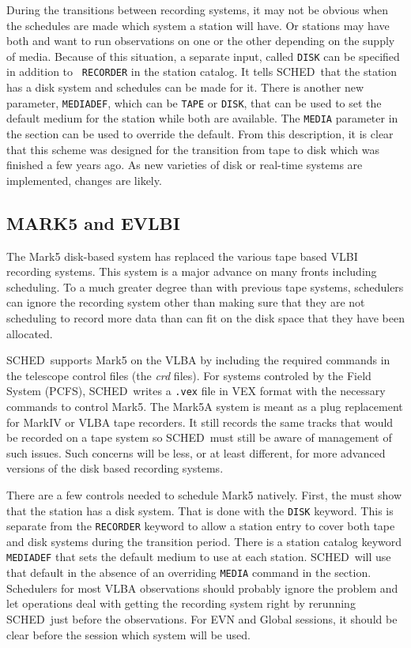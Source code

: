 \documentclass{report}
\newcommand{\schedb}{{\sc SCHED~}}
\begin{document}
During the transitions between recording systems, it may not be
obvious when the schedules are made which system a station will have.
Or stations may have both and want to run observations on one or the
other depending on the supply of media.  Because of this situation, a
separate input, called {\tt DISK} can be specified in addition to {\tt
RECORDER} in the station catalog.  It tells \schedb that the station
has a disk system and schedules can be made for it.  There is another
new parameter, {\tt MEDIADEF}, which can be {\tt TAPE} or {\tt DISK},
that can be used to set the default medium for the station while both
are available.  The {\tt MEDIA} parameter in the  section can be used to override the default.
From this description, it is clear that this scheme was designed for
the transition from tape to disk which was finished a few years ago.
As new varieties of disk or real-time systems are implemented, changes
are likely.

\subsection{\label{SSEC:MK5}MARK5 and EVLBI}

The Mark5 disk-based system has replaced the various tape based VLBI
recording systems.  This system is a major advance on many fronts
including scheduling.  To a much greater degree than with previous
tape systems, schedulers can ignore the recording system other than
making sure that they are not scheduling to record more data than can
fit on the disk space that they have been allocated.

\schedb supports Mark5 on the VLBA by including the required commands
in the telescope control files (the {\sl crd} files).  For systems
controled by the Field System (PCFS), \schedb writes a {\tt .vex} file
in VEX format with the necessary commands to control Mark5.  The Mark5A
system is meant as a plug replacement for MarkIV or VLBA tape recorders.
It still records the same tracks that would be recorded on a tape
system so \schedb must still be aware of management of such issues.
Such concerns will be less, or at least different, for more advanced
versions of the disk based recording systems.

There are a few controls needed to schedule Mark5 natively.  First,
the  must show that the station
has a disk system.  That is done with the {\tt DISK} keyword.  This is
separate from the {\tt RECORDER} keyword to allow a station entry to
cover both tape and disk systems during the transition period.  There
is a station catalog keyword {\tt MEDIADEF} that sets the default
medium to use at each station.  \schedb will use that default in the
absence of an overriding {\tt MEDIA} command in the  section.  Schedulers for most VLBA observations
should probably ignore the problem and let operations deal with
getting the recording system right by rerunning \schedb just before
the observations.  For EVN and Global sessions, it should be clear
before the session which system will be used.
\end{document}
